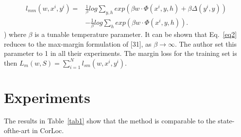 \documentclass[10pt,twocolumn,letterpaper]{article}
\begin{document}
\begin{equation}
\begin{aligned}
l_{mm}(w,x^i,y^i)=&\frac{1}{\beta}log\sum_{y,h}exp(\beta w\cdot\Phi(x^i,y,h)+\beta\Delta(y^i,y)) \\
&-\frac{1}{\beta}log\sum_{h}exp(\beta w\cdot\Phi(x^i,y,h)).
\end{aligned}\label{eq2}
\end{equation}  
)
where $\beta$ is a tunable temperature parameter. It can be shown that Eq.~\ref{eq2} reduces to the max-margin formulation
of [31], as $\beta\to\infty$. The author set this parameter to 1 in all their experiments. The margin loss for the training set is then $L_m(w,S)=\sum_{i=1}^Nl_{sm}(w,x^i,y^i)$.
\section{Experiments}
 The results in Table~\ref{tab1} show that the method is comparable to the state-ofthe-art in CorLoc.
 
{\small


}
\end{document}
